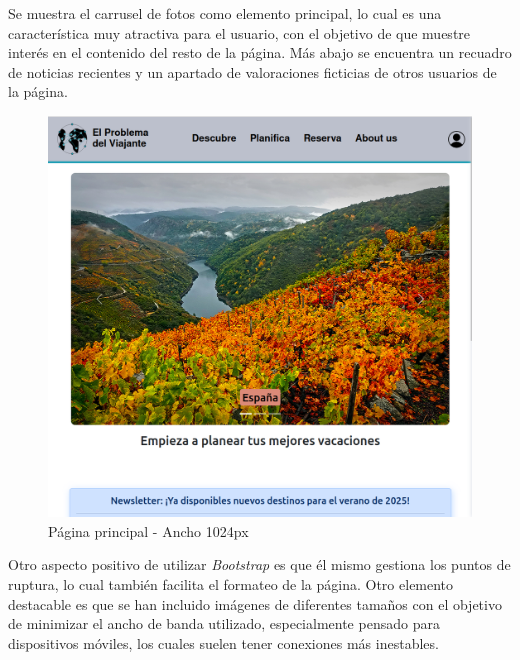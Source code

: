 \documentclass[11pt, a4paper]{book}
\begin{document}
	Se muestra el carrusel de fotos como elemento principal, lo cual es una característica muy atractiva para el usuario, con el objetivo de que muestre interés en el contenido del resto de la página. Más abajo se encuentra un recuadro de noticias recientes y un apartado de valoraciones ficticias de otros usuarios de la página.

	\begin{figure} [H]
		\centering
		\includegraphics[height=0.4\textheight]{CSS/1-3 1024.png}
		\caption{Página principal - Ancho 1024px}
	\end{figure}
	
	Otro aspecto positivo de utilizar \textit{Bootstrap} es que él mismo gestiona los puntos de ruptura, lo cual también facilita el formateo de la página. Otro elemento destacable es que se han incluido imágenes de diferentes tamaños con el objetivo de minimizar el ancho de banda utilizado, especialmente pensado para dispositivos móviles, los cuales suelen tener conexiones más inestables.
\end{document}
